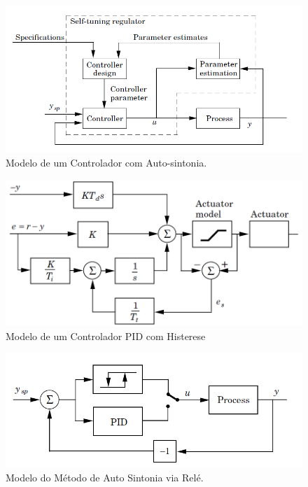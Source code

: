 \begin{figure}[htb]
  \caption{Modelo de um Controlador com Auto-sintonia.}
  \begin{center}
      \includegraphics[scale=0.75]{img/pid_adaptative_astrom_p233}
  \end{center}
  \label{fig:pid_adaptative_astrom_p233}
\end{figure}

\begin{figure}[htb]
  \caption{Modelo de um Controlador PID com Histerese}
  \begin{center}
      \includegraphics[scale=0.65]{img/pid_antiwindup_astrom_p83}
  \end{center}
  \label{fig:pid_antiwindup_astrom_p83}
\end{figure}

\begin{figure}[htb]
  \caption{Modelo do Método de Auto Sintonia via Relé.}
  \begin{center}
      \includegraphics[scale=0.75]{img/pid_autotuning_relay_astrom_p239}
  \end{center}
  \label{fig:pid_autotuning_relay_astrom_p239}
\end{figure}

